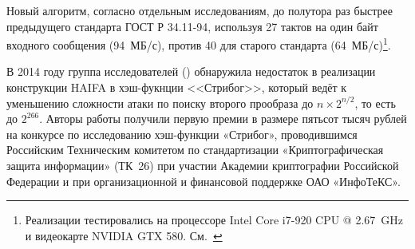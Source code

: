 Новый алгоритм, согласно отдельным исследованиям, до полутора раз быстрее предыдущего стандарта ГОСТ Р 34.11-94, используя 27 тактов на один байт входного сообщения (94~МБ/с), против 40 для старого стандарта (64~МБ/с)\footnote{Реализации тестировались на процессоре Intel Core i7-920 CPU @ 2.67~GHz и видеокарте NVIDIA GTX 580. См.~\cite{Lebedev:2013}}.

В 2014 году группа исследователей (\cite{Guo:Jean:Leurent:Peyrin:Wang:2014}) обнаружила недостаток в реализации конструкции HAIFA в хэш-фукнции <<Стрибог>>, который ведёт к уменьшению сложности атаки по поиску второго прообраза до $n \times 2^{n/2}$, то есть до $2^{266}$. Авторы работы получили первую премии в размере пятьсот тысяч рублей на конкурсе по исследованию хэш-функции «Стрибог», проводившимся Российским Техническим комитетом по стандартизации «Криптографическая защита информации» (ТК~26) при участии Академии криптографии Российской Федерации и при организационной и финансовой поддержке ОАО «ИнфоТеКС».

